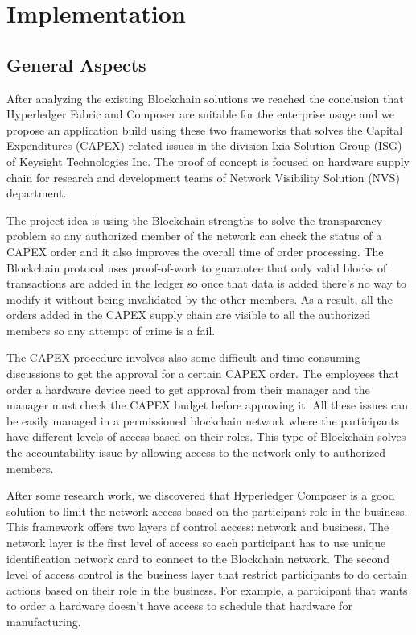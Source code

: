 \chapter{Implementation}
\label{chapter:chapter3}

\section{General Aspects}
\label{sec:chapter3-section1}
After analyzing the existing Blockchain solutions we reached the conclusion that Hyperledger Fabric and Composer are suitable for the enterprise usage and we propose an application build using these two frameworks that solves the Capital Expenditures (CAPEX) related issues in the division Ixia Solution Group (ISG) of Keysight Technologies Inc. The proof of concept is focused on hardware supply chain for research and development teams of Network Visibility Solution (NVS) department.

The project idea is using the Blockchain strengths to solve the transparency problem so any authorized member of  the network can check the status of a CAPEX order and it also improves the overall time of order processing.
The Blockchain protocol uses proof-of-work to guarantee that only valid blocks of transactions are added in the ledger so once that data is added there's no way to modify it without being invalidated by the other members.
As a result, all the orders added in the CAPEX supply chain are visible to all the authorized members so any attempt of crime is a fail.

The CAPEX procedure involves also some difficult and time consuming discussions to get the approval for a certain CAPEX order. The employees that order a hardware device need to get approval from their manager and the manager must check the CAPEX budget before approving it. All these issues can be easily managed in a permissioned blockchain network where the participants have different levels of access based on their roles. This type of Blockchain solves the accountability issue by allowing access to the network only to authorized members. 

After some research work, we discovered that Hyperledger Composer is a good solution to limit the network access based on the participant role in the business. This framework offers two layers of control access: network and business. The network layer is the first level of access so each participant has to use unique identification network card to connect to the Blockchain network. The second level of access control is the business layer that restrict participants to do certain actions based on their role in the business. For example, a participant that wants to order a hardware doesn't have access to schedule that hardware for manufacturing.

